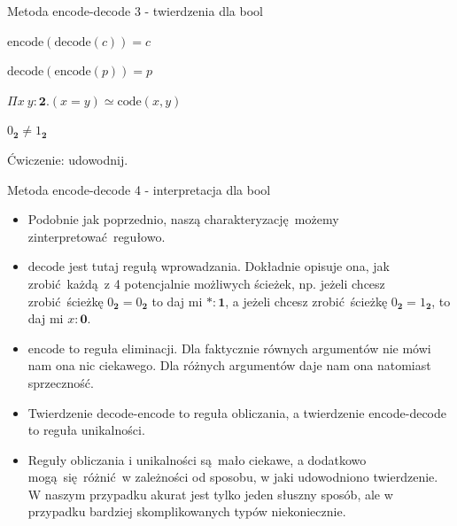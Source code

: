 \documentclass{beamer}
\newcommand{\code}{\text{code}}
\newcommand{\encode}{\text{encode}}
\newcommand{\decode}{\text{decode}}
\begin{document}
\begin{frame}{Metoda encode-decode 3 - twierdzenia dla bool}

\begin{theorem}
$\encode(\decode(c)) = c$
\end{theorem}
	
\begin{theorem}
$\decode(\encode(p)) = p$
\end{theorem}

\begin{corollary}
$\Pi x\ y : \mathbf{2}. (x = y) \simeq \code(x, y)$
\end{corollary}

\begin{corollary}
$0_\mathbf{2} \neq 1_\mathbf{2}$
\end{corollary}

Ćwiczenie: udowodnij.

\end{frame}

\begin{frame}{Metoda encode-decode 4 - interpretacja dla bool}
\begin{itemize}
	\item Podobnie jak poprzednio, naszą charakteryzację możemy zinterpretować regułowo.
	\item $\decode$ jest tutaj regułą wprowadzania. Dokładnie opisuje ona, jak zrobić każdą z 4 potencjalnie możliwych ścieżek, np. jeżeli chcesz zrobić ścieżkę $0_\mathbf{2} = 0_\mathbf{2}$ to daj mi $* : \mathbf{1}$, a jeżeli chcesz zrobić ścieżkę $0_\mathbf{2} = 1_\mathbf{2}$, to daj mi $x : \mathbf{0}$.
	\item $\encode$ to reguła eliminacji. Dla faktycznie równych argumentów nie mówi nam ona nic ciekawego. Dla różnych argumentów daje nam ona natomiast sprzeczność.
	\item Twierdzenie decode-encode to reguła obliczania, a twierdzenie encode-decode to reguła unikalności.
	\item Reguły obliczania i unikalności są mało ciekawe, a dodatkowo mogą się różnić w zależności od sposobu, w jaki udowodniono twierdzenie. W naszym przypadku akurat jest tylko jeden słuszny sposób, ale w przypadku bardziej skomplikowanych typów niekoniecznie.
\end{itemize}
\end{frame}
\end{document}
